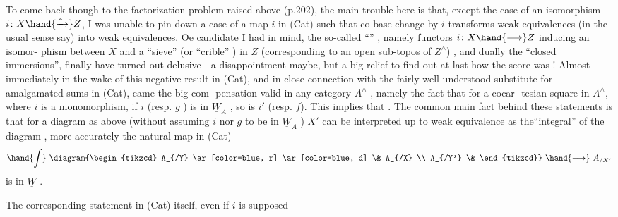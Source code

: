 To come back though to the factorization problem raised above (p.202),
the main trouble here is that, except the case of an isomorphism $i\colon X\hand{\xrightarrow{\sim}}Z$,
I was unable to pin down a  case of a  map $i$ in (Cat) such that
co-base change by $i$ transforms weak equivalences (in the usual sense say)
into weak equivalences. Oe candidate I had in mind, the so-called
``\hand{\uline{\textcolor{black}{open immersions}}}'' ,  namely functors $i\colon X\hand{\longrightarrow}Z$ inducing an isomor-%
phism between $X$ and a ``sieve'' (or ``crible'' ) in $Z$ (corresponding to an
open sub-topos of $Z^{\wedge}$) , and dually the ``closed immersions'', finally have
turned out delusive - a disappointment maybe, but  a big relief to find
out at last how the score was ! Almost immediately in the wake of this
negative result in (Cat), and in close connection with the fairly well
understood \hand{$\int$} substitute for amalgamated sums in (Cat), came the big com-%
pensation valid in any category $A^{\wedge}$ , namely the fact that for a cocar-%
tesian square
in $A^{\wedge}$, where $i$ is a monomorphism, if $i$ (resp. $g$ ) is in $\underline{W}_A$ , so is
$i'$ (resp. $f$). This implies that 
\hand{\uline{\textcolor{black}{transforms weak equivalences into weak equivalences}}}. The common main fact
behind these statements is that for a diagram as above (without assuming
$i$ nor $g$ to be in $\underline{W}_A$ )\hand{,} $X'$ can be interpreted up to weak equivalence as
the``integral'' of the diagram
,
more accurately\hand{,} the natural map in (Cat)
\[\hand{\int}\ \diagram{\begin{tikzcd}
A_{/Y} \ar[color=blue, r] \ar[color=blue, d] \& A_{/X} \\
A_{/Y'} \&
\end{tikzcd}}\ \hand{\longrightarrow}\ A_{/X'}\]
is in $\underline{W}$ .

The corresponding statement in (Cat) itself, even if $i$ is supposed

